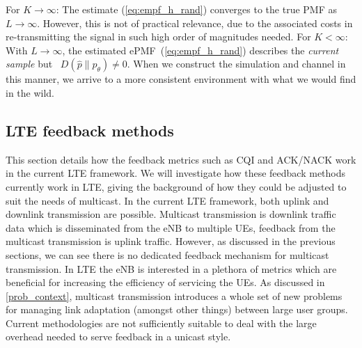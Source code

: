 \documentclass{article}
\begin{document}
For $K \rightarrow \infty$: The estimate (\ref{eq:empf_h_rand}) converges to the true PMF as $L \rightarrow \infty$. However, this is not of practical relevance, due to the associated costs in re-transmitting the signal in such high order of magnitudes needed. For $K <\infty:$ With $L \rightarrow \infty$, the estimated ePMF~(\ref{eq:empf_h_rand}) describes the \emph{current sample} but ~$D(\hat{p}\| p_{\theta}) \neq 0$. When we construct the simulation and channel in this manner, we arrive to a more consistent environment with what we would find in the wild.


\subsection{LTE feedback methods}\label{lte_feedback_current}



This section details how the feedback metrics such as \ac{CQI} and ACK/NACK work in the current LTE framework. We will investigate how these feedback methods currently work in LTE, giving the background of how they could be adjusted to suit the needs of multicast. In the current LTE framework, both uplink and downlink transmission are possible. Multicast transmission is downlink traffic data which is disseminated from the eNB to multiple UEs, feedback from the multicast transmission is uplink traffic. However, as discussed in the previous sections, we can see there is no dedicated feedback mechanism for multicast transmission. In LTE the eNB is interested in a plethora of metrics which are beneficial for increasing the efficiency of servicing the UEs. As discussed in \cref{prob_context}, multicast transmission introduces a whole set of new problems for managing link adaptation (amongst other things) between large user groups. Current methodologies are not sufficiently suitable to deal with the large overhead needed to serve feedback in a unicast style.
\end{document}
